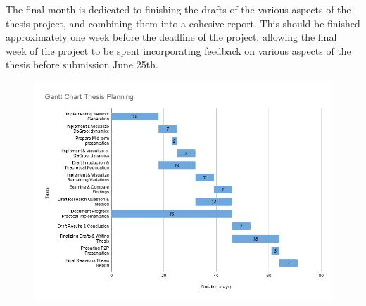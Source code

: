 \documentclass{article}
\begin{document}
The final month is dedicated to finishing the drafts of the various aspects of the thesis project, and combining them into a cohesive report. This should be finished approximately one week before the deadline of the project, allowing the final week of the project to be spent incorporating feedback on various aspects of the thesis before submission June 25th.
\begin{center}
    \begin{figure}[!htbp]
        \centering
        \hspace*{-3cm}
        \includegraphics[width=1.2\textwidth]{ThesisKI/Images/Gantt2.png}
    \end{figure}
\end{center}



\end{document}
